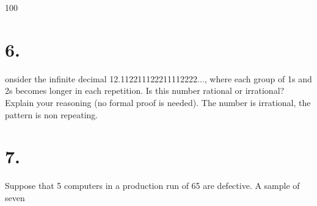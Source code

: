 \documentclass{article}
\begin{document}
100%

\section*{6.}
onsider the infinite decimal 12.112211122211112222..., where each group 
of 1s and 2s becomes longer in each repetition. Is this number rational
or irrational? Explain your reasoning (no formal proof is needed).
The number is irrational, the pattern is non repeating.

\section*{7.}
Suppose that 5 computers in a production run of 65 are defective. A sample of
seven
\end{document}

